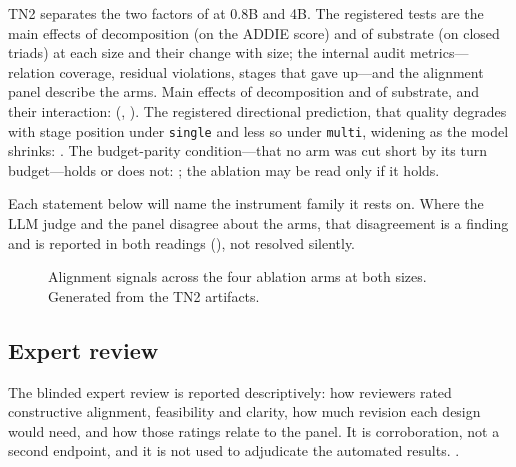 TN2 separates the two factors of  at 0.8B and 4B. The
registered tests are the main effects of decomposition (on the ADDIE score) and of
substrate (on closed triads) at each size and their change with size; the internal
audit metrics---relation coverage, residual violations, stages that gave up---and
the alignment panel describe the arms. Main effects of decomposition and of
substrate, and their interaction: \TBD{} (, ). The
registered directional prediction, that quality degrades with stage position under
\texttt{single} and less so under \texttt{multi}, widening as the model shrinks:
\TBD. The budget-parity condition---that no arm was cut short by its turn
budget---holds or does not: \TBD; the ablation may be read only if it holds.

Each statement below will name the instrument family it rests on. Where the LLM judge
and the panel disagree about the arms, that disagreement is a finding and is
reported in both readings (), not resolved silently.

\begin{table}[t]
  \caption{The four ablation arms at 0.8B and 4B. Generated from the TN2 artifacts.}
  \label{tab:ablation}
  \small
  \centering
\end{table}

\begin{figure}[t]
  \centering
  \caption{Alignment signals across the four ablation arms at both sizes. Generated
  from the TN2 artifacts.}
  \label{fig:ablation-components}
\end{figure}

\subsection{Expert review}
\label{sec:expert-results}

The blinded expert review is reported descriptively: how reviewers rated
constructive alignment, feasibility and clarity, how much revision each design would
need, and how those ratings relate to the panel. It is corroboration, not a second
endpoint, and it is not used to adjudicate the automated results. \TBD.

